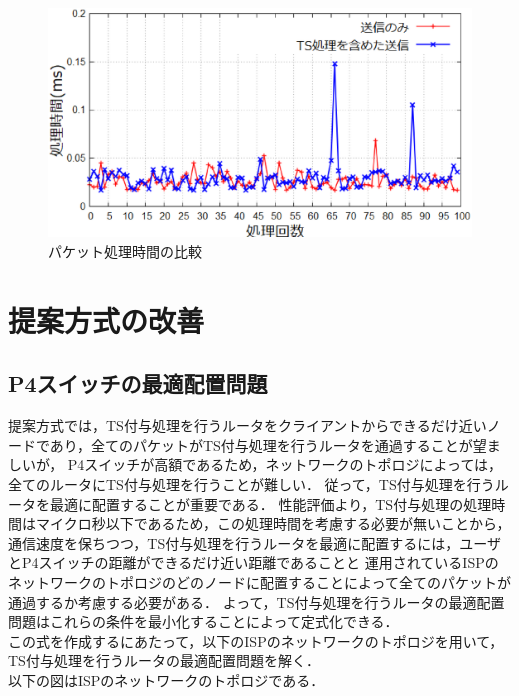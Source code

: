 \documentclass[a4j,11pt]{jreport}
\begin{document}
\begin{figure}[htbp]
  \centering
  \includegraphics[scale=0.5]{data/soturon_shori_hikaku6.eps}
  \vspace{0mm}
  \caption{パケット処理時間の比較}
  \label{fig:shori}
\end{figure}

\chapter{提案方式の改善}

\section{P4スイッチの最適配置問題}
提案方式では，TS付与処理を行うルータをクライアントからできるだけ近いノードであり，全てのパケットがTS付与処理を行うルータを通過することが望ましいが，
P4スイッチが高額であるため，ネットワークのトポロジによっては，全てのルータにTS付与処理を行うことが難しい．
従って，TS付与処理を行うルータを最適に配置することが重要である．
性能評価より，TS付与処理の処理時間はマイクロ秒以下であるため，この処理時間を考慮する必要が無いことから，
通信速度を保ちつつ，TS付与処理を行うルータを最適に配置するには，ユーザとP4スイッチの距離ができるだけ近い距離であることと
運用されているISPのネットワークのトポロジのどのノードに配置することによって全てのパケットが通過するか考慮する必要がある．
よって，TS付与処理を行うルータの最適配置問題はこれらの条件を最小化することによって定式化できる．\\
\indent
この式を作成するにあたって，以下のISPのネットワークのトポロジを用いて，TS付与処理を行うルータの最適配置問題を解く．\\
以下の図はISPのネットワークのトポロジである．
\end{document}
